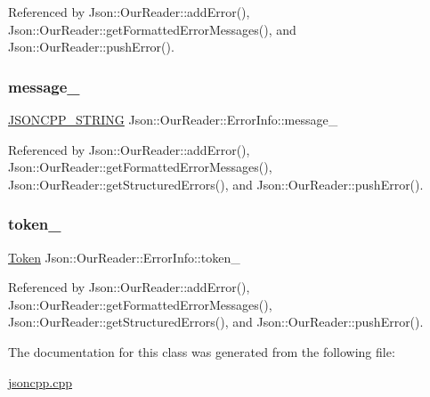 Referenced by Json\+::\+Our\+Reader\+::add\+Error(), Json\+::\+Our\+Reader\+::get\+Formatted\+Error\+Messages(), and Json\+::\+Our\+Reader\+::push\+Error().

\mbox{\label{classJson_1_1OurReader_1_1ErrorInfo_af14b6bf58ee1cb3388c18ee336ee2394_af14b6bf58ee1cb3388c18ee336ee2394}} 
\subsubsection{\texorpdfstring{message\+\_\+}{message\_}}
{\footnotesize\ttfamily \hyperlink{json_8h_a1e723f95759de062585bc4a8fd3fa4be_a1e723f95759de062585bc4a8fd3fa4be}{J\+S\+O\+N\+C\+P\+P\+\_\+\+S\+T\+R\+I\+NG} Json\+::\+Our\+Reader\+::\+Error\+Info\+::message\+\_\+}



Referenced by Json\+::\+Our\+Reader\+::add\+Error(), Json\+::\+Our\+Reader\+::get\+Formatted\+Error\+Messages(), Json\+::\+Our\+Reader\+::get\+Structured\+Errors(), and Json\+::\+Our\+Reader\+::push\+Error().

\mbox{\label{classJson_1_1OurReader_1_1ErrorInfo_ad05204ecabe5e7201a842935b874ae9a_ad05204ecabe5e7201a842935b874ae9a}} 
\subsubsection{\texorpdfstring{token\+\_\+}{token\_}}
{\footnotesize\ttfamily \hyperlink{classJson_1_1OurReader_1_1Token}{Token} Json\+::\+Our\+Reader\+::\+Error\+Info\+::token\+\_\+}



Referenced by Json\+::\+Our\+Reader\+::add\+Error(), Json\+::\+Our\+Reader\+::get\+Formatted\+Error\+Messages(), Json\+::\+Our\+Reader\+::get\+Structured\+Errors(), and Json\+::\+Our\+Reader\+::push\+Error().



The documentation for this class was generated from the following file\+:\begin{DoxyCompactItemize}
\item 
\hyperlink{jsoncpp_8cpp}{jsoncpp.\+cpp}\end{DoxyCompactItemize}
